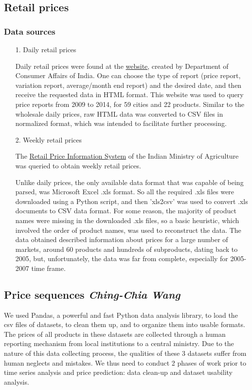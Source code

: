 \subsection*{Retail prices}
\subsubsection*{Data sources}

\begin{itemize}

\item[1.] Daily retail prices

Daily retail prices were found at the \href{http://fcainfoweb.nic.in/}{website}, created by Department of Consumer Affairs of India. One can choose the type of report (price report, variation report, average/month end report) and the desired date, and then receive the requested data in HTML format. This website was used to query price reports from 2009 to 2014, for 59 cities and 22 products. Similar to the wholesale daily prices, raw HTML data was converted to CSV files in normalized format, which was intended to facilitate further processing.

\item[2.] Weekly retail prices

The \href{http://rpms.dacnet.nic.in/}{Retail Price Information System} of the Indian Ministry of Agriculture was queried to obtain weekly retail prices.\par
Unlike daily prices, the only available data format that was capable of being parsed, was Microsoft Excel .xls format. So all the required .xls files were downloaded using a Python script, and then 'xls2csv' was used to convert .xls documents to CSV data format. For some reason, the majority of product names were missing in the downloaded .xls files, so a basic heuristic, which involved the order of product names, was used to reconstruct the data.
The data obtained described information about prices for a large number of markets, around 60 products and hundreds of subproducts, dating back to 2005, but, unfortunately, the data was far from complete, especially for 2005-2007 time frame.

\end{itemize}

\subsection*{Price sequences \footnotesize\emph{Ching-Chia Wang}}
We used Pandas, a powerful and fast Python data analysis library, to load the csv files of datasets, to clean them up, and to organize them into usable formats. The prices of all products in these datasets are collected through a human reporting mechanism from local institutions to a central ministry. Due to the nature of this data collecting process, the qualities of these 3 datasets suffer from human neglects and mistakes. We thus need to conduct 2 phases of work prior to time series analysis and price prediction: data clean-up and dataset usability analysis.

